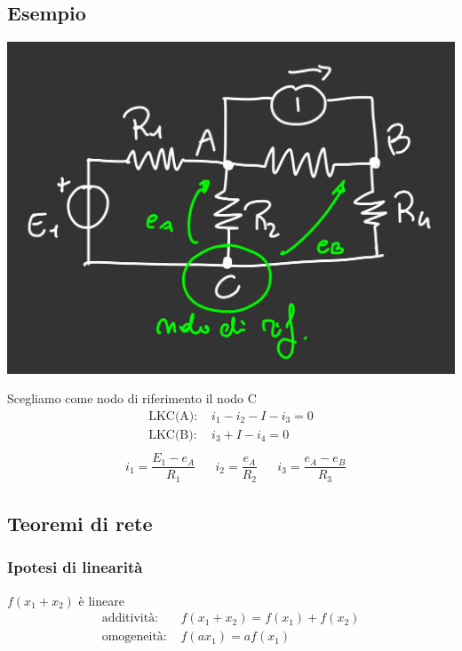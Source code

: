 \documentclass{article}
\begin{document}
\subsection{Esempio}
\begin{center}
    \includegraphics[scale=0.15]{Image/Esempio_PotenzialiNodo.png}
\end{center}
Scegliamo come nodo di riferimento il nodo C
\begin{align*}
    \text{LKC(A): }&i_1-i_2 - I - i_3=0\\
    \text{LKC(B): }&i_3 + I - i_4=0\\
\end{align*}
\begin{align*}
    &i_1=\dfrac{E_1-e_A}{R_1} & &i_2 = \dfrac{e_A}{R_2} & &i_3 = \dfrac{e_A-e_B}{R_3}
\end{align*}







\subsection{Teoremi di rete}
\subsubsection*{Ipotesi di linearità}
 $f(x_1+x_2)$ è lineare
\begin{align*}
    \text{additività: } &f(x_1+x_2) = f(x_1) + f(x_2)\\
    \text{omogeneità: } &f(ax_1) = af(x_1)
\end{align*}
\end{document}
